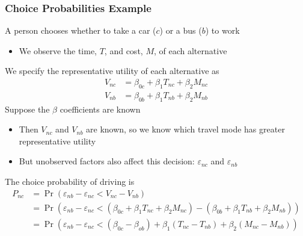 \documentclass{beamer}\usepackage[]{graphicx}\usepackage[]{xcolor}
\begin{document}
\begin{frame}\frametitle{Choice Probabilities Example}
    A person chooses whether to take a car ($c$) or a bus ($b$) to work
    \begin{itemize}
    	\item We observe the time, $T$, and cost, $M$, of each alternative
    \end{itemize}
    \vspace{1ex}
    We specify the representative utility of each alternative as
    \begin{align*}
    	V_{nc} & = \beta_{0c} + \beta_1 T_{nc} + \beta_2 M_{nc} \\
    	V_{nb} & = \beta_{0b} + \beta_1 T_{nb} + \beta_2 M_{nb}
    \end{align*}
    Suppose the $\beta$ coefficients are known 
    \begin{itemize}
    	\item Then $V_{nc}$ and $V_{nb}$ are known, so we know which travel mode has greater representative utility
    	\item But unobserved factors also affect this decision: $\varepsilon_{nc}$ and $\varepsilon_{nb}$
    \end{itemize}
    \vspace{1ex}
    The choice probability of driving is
    \begin{align*}
    	P_{nc} & = \Pr(\varepsilon_{nb} - \varepsilon_{nc} < V_{nc} - V_{nb}) \\
    	& = \Pr(\varepsilon_{nb} - \varepsilon_{nc} < (\beta_{0c} + \beta_1 T_{nc} + \beta_2 M_{nc}) - (\beta_{0b} + \beta_1 T_{nb} + \beta_2 M_{nb})) \\
    	& = \Pr(\varepsilon_{nb} - \varepsilon_{nc} < (\beta_{0c} - \beta_{ob}) + \beta_1(T_{nc} - T_{nb}) + \beta_2(M_{nc} - M_{nb}))
    \end{align*}
\end{frame}
\end{document}
